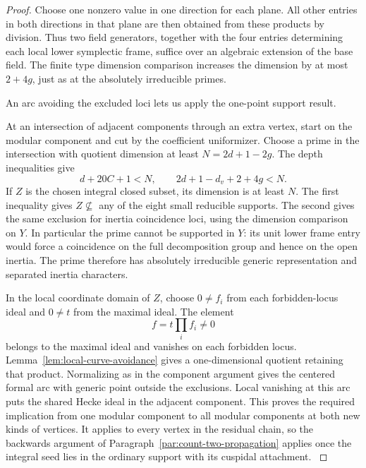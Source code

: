 \begin{proof}
Choose one nonzero
value in one direction for each plane. All other
entries in both directions in that plane are
then obtained from these products by division.
Thus two field generators, together with the
four entries determining each local lower
symplectic frame, suffice over an algebraic
extension of the base field. The finite type
dimension comparison increases the dimension
by at most \(2+4g\), just as at the absolutely
irreducible primes.


An arc avoiding the excluded loci lets us apply the one-point support result.

At an intersection of adjacent components through
an extra vertex, start on the modular component
and cut by the coefficient uniformizer. Choose
a prime in the intersection with quotient
dimension at least \(N=2d+1-2g\).
The depth inequalities give
\[
     d+20C+1<N,\qquad 2d+1-d_v+2+4g<N .
\]
If \(Z\) is the chosen integral closed subset, its
dimension is at least \(N\). The first inequality gives
\(Z\not\subseteq\) any of the eight small reducible supports.
The second gives the same exclusion for inertia coincidence loci,
using the dimension comparison on \(Y\).
In particular the prime cannot be supported
in \(Y\): its unit lower frame entry would
force a coincidence on the full decomposition
group and hence on the open inertia.
The prime therefore has absolutely irreducible
generic representation and separated inertia
characters.

In the local coordinate domain of \(Z\), choose \(0\ne f_i\) from each forbidden-locus ideal and \(0\ne t\) from the maximal ideal. The element
\[
 f=t\prod_i f_i\ne0
\]
belongs to the maximal ideal and vanishes on each forbidden locus. Lemma~\ref{lem:local-curve-avoidance} gives a one-dimensional quotient retaining that product. Normalizing as in the component argument gives the centered formal arc with generic point outside the exclusions. Local vanishing at this
arc puts the shared Hecke ideal in the adjacent
component. This proves the required implication
from one modular component to all modular
components at both new kinds of vertices.
It applies to every vertex in the residual
chain, so the backwards argument of
Paragraph~\ref{par:count-two-propagation} applies
once the integral seed lies in the ordinary
support with its cuspidal attachment.
\label{cor:ordinary-count-iii-components-1}
\end{proof}
